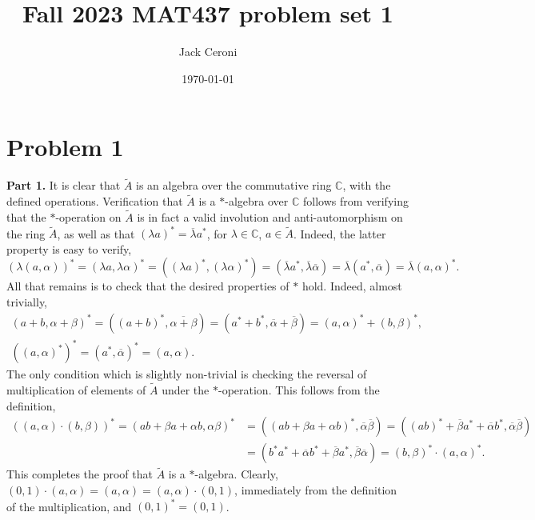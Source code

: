 \documentclass[aps,pra,showpacs,notitlepage,onecolumn,superscriptaddress,nofootinbib]{revtex4-1}
\newcommand{\hhrulefill}{\hspace{-1.0em}\hrulefill}
\theoremstyle{definition}
\begin{document}
\title{Fall 2023 MAT437 problem set 1}
\author{Jack Ceroni}

\date{\today}

\maketitle

\hhrulefill

\section{Problem 1}

\noindent \textbf{Part 1.} It is clear that $\widetilde{A}$ is an algebra over the commutative ring $\mathbb{C}$, with the defined operations. Verification
that $\widetilde{A}$ is a $*$-algebra over $\mathbb{C}$ follows from verifying that the $*$-operation on $\widetilde{A}$ is in fact a valid involution and anti-automorphism on the ring $\widetilde{A}$,
as well as that $(\lambda a)^{*} = \overline{\lambda} a^{*}$, for $\lambda \in \mathbb{C}$, $a \in \widetilde{A}$. Indeed, the latter property is easy to verify,
\begin{equation}
  (\lambda (a, \alpha))^{*} = (\lambda a, \lambda \alpha)^{*} = ((\lambda a)^{*}, (\lambda \alpha)^{*}) = (\overline{\lambda} a^{*}, \overline{\lambda} \overline{\alpha}) = \overline{\lambda} (a^{*}, \overline{\alpha}) = \overline{\lambda} (a, \alpha)^{*}.
\end{equation}
All that remains is to check that the desired properties of $*$ hold. Indeed, almost trivially,
\begin{align}
  (a + b, \alpha + \beta)^{*} = ((a + b)^{*}, \overline{\alpha + \beta}) = (a^{*} + b^{*}, \overline{\alpha} + \overline{\beta}) = (a, \alpha)^{*} + (b, \beta)^{*}, \\
  \left( (a, \alpha)^{*} \right)^{*} = (a^{*}, \overline{\alpha})^{*} = (a, \alpha).
\end{align}
The only condition which is slightly non-trivial is checking the reversal of multiplication of elements of $\widetilde{A}$ under the $*$-operation. This follows from the definition,
\begin{align}
  ((a, \alpha) \cdot (b, \beta))^{*} = (ab + \beta a + \alpha b, \alpha \beta)^{*}& = ((ab + \beta a + \alpha b)^{*}, \overline{\alpha} \overline{\beta})  = ((ab)^{*} + \overline{\beta} a^{*} + \overline{\alpha} b^{*}, \overline{\alpha} \overline{\beta})
  \\ & = (b^{*} a^{*} + \overline{\alpha} b^{*} + \overline{\beta} a^{*}, \overline{\beta} \overline{\alpha}) = (b, \beta)^{*} \cdot (a, \alpha)^{*}.
\end{align}
This completes the proof that $\widetilde{A}$ is a $*$-algebra. Clearly, $(0, 1) \cdot (a, \alpha) = (a, \alpha) = (a, \alpha) \cdot (0, 1)$, immediately from the definition of the multiplication, and $(0, 1)^{*} = (0, 1)$.
\end{document}
